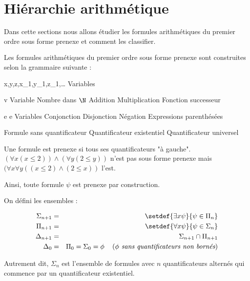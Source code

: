 \section{Hiérarchie arithmétique}


Dans cette sections nous allons étudier les formules arithmétiques du premier ordre sous forme prenexe et comment les classifier.



\begin{definition}
	Les formules arithmétiques du premier ordre sous forme prenexe sont construites selon la grammaire suivante :

	\begin{syntaxdef}
		 {x,y,z,x_1,y_1,z_1,\ldots} {Variables}
	\end{syntaxdef}

	\begin{syntaxdef}
		 {v} {Variable}
		 {Nombre dans $\N$}
		 {Addition}
		 {Multiplication}
		 {Fonction successeur}
	\end{syntaxdef}

	\begin{syntaxdef}
		\syntaxHeader {\phi} {e \leq e} {Variables}
		\syntax {\phi \land \phi} {Conjonction}
		\syntax {\phi \lor \phi} {Disjonction}
		\syntax {\lnot \phi} {Négation}
		\syntax {(\phi)} {Expressions parenthésées}
	\end{syntaxdef}

	\begin{syntaxdef}
		\syntaxHeader {\psi} {\phi} {Formule sans quantificateur}
		 {Quantificateur existentiel}
		 {Quantificateur universel}
	\end{syntaxdef}


	Une formule est prenexe si tous ses quantificateurs "à gauche".
	$(\forall x (x \leq 2)) \land  (\forall y (2 \leq y))$ n'est pas sous forme prenexe mais
	$(\forall x \forall y ((x \leq 2) \land  (2 \leq x))$ l'est.

	Ainsi, toute formule $\psi$ est prenexe par construction.
\end{definition}



\begin{definition}

	On défini les ensembles :

	\begin{eqnarray*}
		\Sigma_{n + 1} &=& \setdef { \exists x \psi } {\psi \in \Pi_n}  \\
		\Pi_{n + 1} &=& \setdef { \forall x \psi } {\psi \in \Sigma_n}  \\
		\Delta_{n + 1} &=& \Sigma_{n + 1} \cap \Pi_{n + 1} \\
		\Delta_0 &=& \Pi_0 = \Sigma_0= \phi \reason {$\phi$ sans quantificateurs non bornés}
	\end{eqnarray*}

	Autrement dit, $\Sigma_n$ est l'ensemble de formules avec $n$ quantificateurs alternés qui commence par un quantificateur existentiel.
\end{definition}

